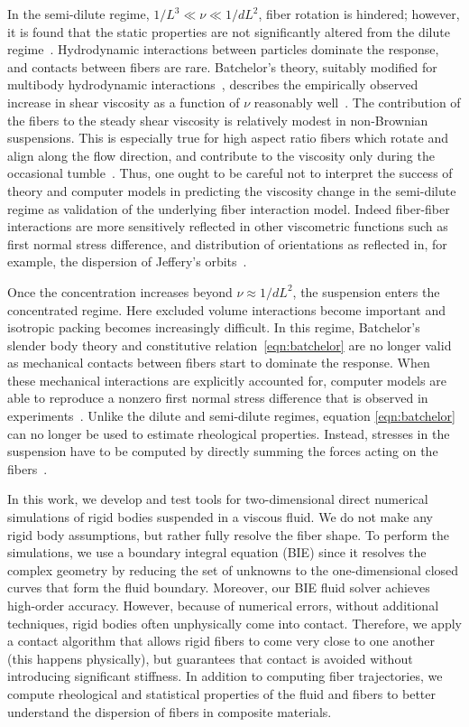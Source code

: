 \documentclass[preprint, 10pt]{elsarticle}
\begin{document}
In the semi-dilute regime, $1/L^3 \ll \nu \ll 1/dL^2$, fiber rotation is
hindered; however, it is found that the static properties are not
significantly altered from the dilute regime~\cite{larsoncf}.
Hydrodynamic interactions between particles dominate the response, and
contacts between fibers are rare. Batchelor's theory, suitably modified
for multibody hydrodynamic interactions~\cite{Shaqfeh1990,
Mackaplow1996}, describes the empirically observed increase in shear
viscosity as a function of $\nu$ reasonably well~\cite{Stover1992,
Bibbo1987, Petrich2000}. The contribution of the fibers to the steady
shear viscosity is relatively modest in non-Brownian suspensions. This
is especially true for high aspect ratio fibers which rotate and align
along the flow direction, and contribute to the viscosity only during
the occasional tumble~\cite{larsoncf}.  Thus, one ought to be careful
not to interpret the success of theory and computer models in predicting
the viscosity change in the semi-dilute regime as validation of the
underlying fiber interaction model. Indeed fiber-fiber interactions are
more sensitively reflected in other viscometric functions such as first
normal stress difference, and distribution of orientations as reflected
in, for example, the dispersion of Jeffery's
orbits~\cite{Lindstroem2009}.

Once the concentration increases beyond $\nu \approx 1/dL^2$, the
suspension enters the concentrated regime. Here excluded volume
interactions become important and isotropic packing becomes increasingly
difficult. In this regime, Batchelor's slender body theory and
constitutive relation~\eqref{eqn:batchelor} are no longer valid as
mechanical contacts between fibers start to dominate the response. When
these mechanical interactions are explicitly accounted for, computer
models are able to reproduce a nonzero first normal stress difference
that is observed in experiments~\cite{Sundararajakumar1997, Ausias2006,
Lindstroem2008}. Unlike the dilute and semi-dilute regimes, equation
\eqref{eqn:batchelor} can no longer be used to estimate rheological
properties. Instead, stresses in the suspension have to be computed by
directly summing the forces acting on the fibers~\cite{Ausias2006,
Lindstroem2008}.

In this work, we develop and test tools for two-dimensional direct
numerical simulations of rigid bodies suspended in a viscous fluid.  We
do not make any rigid body assumptions, but rather fully resolve the
fiber shape.  To perform the simulations, we use a boundary integral
equation (BIE) since it resolves the complex geometry by reducing the
set of unknowns to the one-dimensional closed curves that form the fluid
boundary.  Moreover, our BIE fluid solver achieves high-order accuracy.
However, because of numerical errors, without additional techniques,
rigid bodies often unphysically come into contact.  Therefore, we apply
a contact algorithm that allows rigid fibers to come very close to one
another (this happens physically), but guarantees that contact is
avoided without introducing significant stiffness.  In addition to
computing fiber trajectories, we compute rheological and statistical
properties of the fluid and fibers to better understand the dispersion
of fibers in composite materials.
\end{document}
